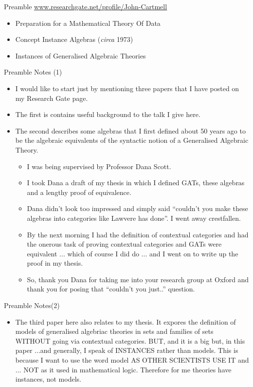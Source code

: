 \begin{frame}{Preamble}
\underline{\url{www.researchgate.net/profile/John-Cartmell}}
\medskip
\begin{itemize}
\item Preparation for a Mathematical Theory Of Data
\item Concept Instance Algebras (\textit{circa} 1973)
\item Instances of Generalised Algebraic Theories 
\end{itemize}
\end{frame}
\ifNotesnAll
\begin{frame}{Preamble Notes (1)}
\begin{itemize}
\item I would like to start just by mentioning three papers that I have posted on my Research Gate page.
\item The first is contains useful background to the talk I give here.
  \item The second describes some algebras that I first defined about 50 years ago to be the algebraic equivalents of the syntactic notion of a Generalised Algebraic Theory. 
\begin{itemize}
  \item I was being supervised by Professor Dana Scott. 
  \item I took Dana a draft of my thesis in which I defined GATs, these algebras and a lengthy proof of equivalence.
  \item Dana didn't look too impressed and simply said ``couldn't you make these algebras into categories like Lawvere has done''. I went away crestfallen.
  \item By the next morning I had the definition of contextual categories and had the onerous task of proving contextual categories and GATs were equivalent ... which of course I did do ... and I went on to write up the proof in my thesis.
  \item So, thank you Dana for taking me into your research group at Oxford and thank you for posing that ``couldn't you just..'' question.
\end{itemize}
\end{itemize}
\end{frame}
\begin{frame}{Preamble Notes(2)}
\begin{itemize}
  \item The third paper here also relates to my thesis. It expores the definition of models of generalised algebriac theories in sets and families of sets WITHOUT going via contextual categories. BUT, and it is a big but, in this paper ...and generally, I speak of INSTANCES rather than models. 
  This is because I want to use  the word model  AS OTHER SCIENTISTS USE IT and ... NOT as it used in mathematical logic. Therefore for me theories have instances, not models.
\end{itemize}
\end{frame}
\fi

